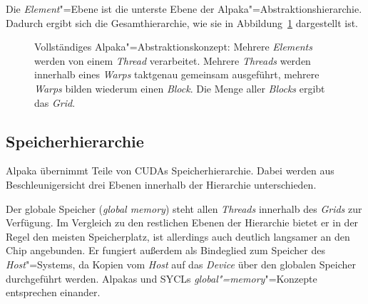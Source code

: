 Die \textit{Element}"=Ebene ist die unterste Ebene der
Alpaka"=Abstraktionshierarchie. Dadurch ergibt sich die Gesamthierarchie, wie
sie in Abbildung~\ref{alpaka:konzepte:abstraktion:elements:vollstaendig}
dargestellt ist.

\begin{figure}
    \centering
    \caption{Vollständiges Alpaka"=Abstraktionskonzept: Mehrere
             \textit{Elements} werden von einem \textit{Thread} verarbeitet.
             Mehrere \textit{Threads} werden innerhalb eines \textit{Warps}
             taktgenau gemeinsam ausgeführt, mehrere \textit{Warps} bilden
             wiederum einen \textit{Block}. Die Menge aller \textit{Blocks}
             ergibt das \textit{Grid}. \cite[nach][22]{worpitz2015}}
    \label{alpaka:konzepte:abstraktion:elements:vollstaendig}
\end{figure}

\subsection{Speicherhierarchie}
\label{alpaka:konzepte:speicher}

Alpaka übernimmt Teile von CUDAs Speicherhierarchie. Dabei werden aus
Beschleunigersicht drei Ebenen innerhalb der Hierarchie unterschieden.

Der globale Speicher (\textit{global memory}) steht allen \textit{Threads}
innerhalb des \textit{Grids} zur Verfügung. Im Vergleich zu den restlichen
Ebenen der Hierarchie bietet er in der Regel den meisten Speicherplatz, ist
allerdings auch deutlich langsamer an den Chip angebunden. Er fungiert außerdem
als Bindeglied zum Speicher des \textit{Host}"=Systems, da Kopien vom
\textit{Host} auf das \textit{Device} über den globalen Speicher durchgeführt
werden. Alpakas und SYCLs \textit{global"=memory}"=Konzepte entsprechen einander.

